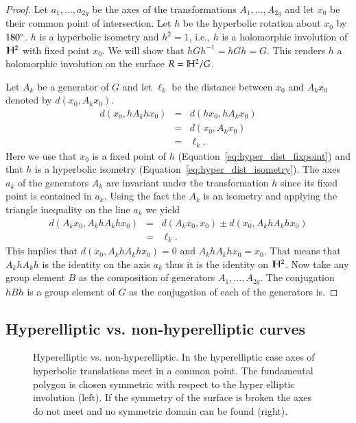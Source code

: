 \documentclass[Thesis]{subfiles}
\begin{document}
\begin{proof}
Let $a_1,\ldots,a_{2g}$ be the axes of the transformations $A_1,\ldots,A_{2g}$ and let $x_0$ be their common point of intersection. 
Let $h$ be the hyperbolic rotation about $x_0$ by $180\degree$. $h$ is a hyperbolic isometry and $h^2=1$, i.e., $h$ is a holomorphic involution of $\mathbb H^2$ with fixed point $x_0$. 
We will show that $hGh^{-1}=hGh=G$. 
This renders $h$ a holomorphic involution on the surface $R=\mathbb H^2/G$.

Let $A_k$ be a generator of $G$ and let $\ell_k$ be the distance between $x_0$ and $A_kx_0$ denoted by $d(x_0,A_kx_0)$.
\begin{eqnarray}
d(x_0,hA_khx_0)&=&d(hx_0,hA_kx_0)\label{eq:hyper_dist_fixpoint}\\
&=&d(x_0,A_kx_0)\label{eq:hyper_dist_isometry}\\
&=&\ell_k.
\end{eqnarray}
Here we use that $x_0$ is a fixed point of $h$ (Equation~\ref{eq:hyper_dist_fixpoint}) and that $h$ is a hyperbolic isometry (Equation~\ref{eq:hyper_dist_isometry}). 
The axes $a_k$ of the generators $A_k$ are invariant under the transformation $h$ since its fixed point is contained in $a_k$.
Using the fact the $A_k$ is an isometry and applying the triangle inequality on the line $a_k$ we yield
\begin{eqnarray*}
d(A_kx_0,A_khA_khx_0)&=&d(A_kx_0,x_0)\pm d(x_0,A_khA_khx_0)\\
&=&\ell_k.
\end{eqnarray*}
This implies that $d(x_0,A_khA_khx_0)=0$ and $A_khA_khx_0=x_0$.
That means that $A_khA_kh$ is the identity on the axis $a_k$ thus it is the identity on $\mathbb H^2$. 
Now take any group element $B$ as the composition of generators $A_1,\dots,A_{2g}$. 
The conjugation $hBh$ is a group element of $G$ as the conjugation of each of the generators is.
\end{proof}

\subsection{Hyperelliptic vs. non-hyperelliptic curves}
\label{sec:non-hyperelliptic}

\begin{figure}
\centering
{}
\caption{Hyperelliptic vs. non-hyperelliptic. In the hyperelliptic case axes of hyperbolic translations meet in a common point. The fundamental polygon is chosen symmetric with respect to the hyper elliptic involution (left). If the symmetry of the surface is broken the axes do not meet and no symmetric domain can be found (right).}
\label{fig:non-hyperelliptic}
\end{figure}
\end{document}
